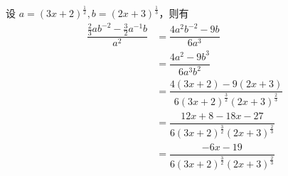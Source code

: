 \documentclass[answers]{exam}
\begin{document}
\begin{questions}
	\begin{solution}
		设 \( a = (3x + 2)^{\frac12}, b = (2x + 3)^{\frac13} \)，则有
		\begin{align*}
			\dfrac{\frac23ab^{-2} - \frac32a^{-1}b}{a^2} & = \dfrac{4a^2b^{-2} - 9b}{6a^3}                                 \\
			                                             & = \dfrac{4a^2 - 9b^3}{6a^3b^2}                                  \\
			                                             & = \dfrac{4(3x+2) - 9(2x +3)}{6(3x+2)^{\frac32}(2x+3)^{\frac23}} \\
			                                             & = \dfrac{12x + 8 - 18x - 27}{6(3x+2)^{\frac32}(2x+3)^{\frac23}} \\
			                                             & = \dfrac{-6x - 19}{6(3x+2)^{\frac32}(2x+3)^{\frac23}}
		\end{align*}
	\end{solution}

\end{questions}
\end{document}
